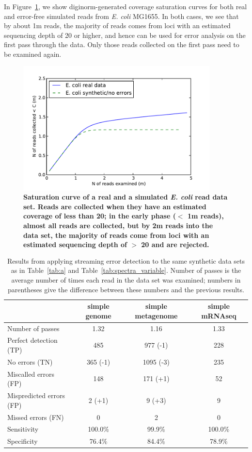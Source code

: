 \documentclass{article}
\begin{document}
In Figure~\ref{fig:saturation}, we show diginorm-generated coverage
saturation curves for both real and error-free simulated reads from
{\em E. coli} MG1655.  In both cases, we see that by about 1m reads,
the majority of reads comes from loci with an estimated sequencing
depth of 20 or higher, and hence can be used for error analysis on the
first pass through the data.  Only those reads collected on the first
pass need to be examined again.

\begin{figure}[!ht]
 \centerline{\includegraphics[width=4in]{./figures/saturation}}
\caption{\bf Saturation curve of a real and a simulated {\em E. coli}
  read data set.  Reads are collected when they have an estimated
  coverage of less than 20; in the early phase ($<$ 1m reads), almost
  all reads are collected, but by 2m reads into the data set, the
  majority of reads come from loci with an estimated sequencing depth
  of $>$ 20 and are rejected.}
\label{fig:saturation}
\end{figure}


\begin{table}
\begin{tabular}{|l|c||c||c|}
\hline
& simple genome & simple metagenome & simple mRNAseq \\
\hline
Number of passes & 1.32 & 1.16 & 1.33 \\
\hline
Perfect detection (TP) & 485 & 977 (-1) & 228 \\
No errors (TN) & 365 (-1) & 1095 (-3) & 235 \\
Miscalled errors (FP) & 148 & 171 (+1) & 52 \\
Mispredicted errors (FP) & 2 (+1) & 9 (+3) & 9 \\
Missed errors (FN) & 0 & 2 & 0 \\
\hline
Sensitivity & 100.0\% & 99.9\% & 100.0\% \\
Specificity & 76.4\% & 84.4\% & 78.9\% \\
\hline
\end{tabular}
\caption{Results from applying streaming error detection to the same
  synthetic data sets as in Table~\ref{tab:a} and
  Table~\ref{tab:spectra_variable}.  Number of passes is the average
  number of times each read in the data set was examined; numbers in
  parentheses give the difference between these numbers and the
  previous results.}
\label{tab:spectra_streaming}

\end{table}
\end{document}
